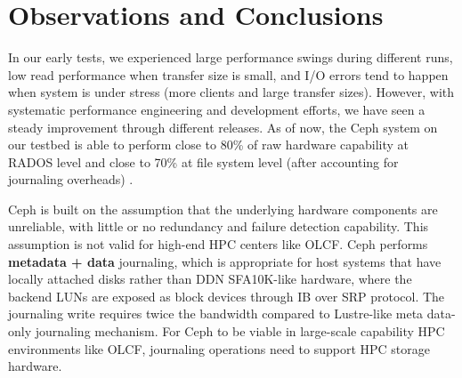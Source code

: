 \section{Observations and Conclusions}
\label{sec:conclusion}

In our early tests, we experienced large performance swings during different
runs, low read performance when transfer size is small, and I/O errors tend to
happen when system is under stress (more clients and large transfer sizes).
However, with systematic performance engineering and development efforts, we
have seen a steady improvement through different releases. As of now, the Ceph
system on our testbed is able to perform close to 80\% of raw hardware
capability at RADOS level and close to 70\% at file system level (after
accounting for journaling overheads) . 

Ceph is built on the assumption that the underlying hardware components are
unreliable, with little or no redundancy and failure detection capability.
This assumption is not valid for high-end HPC centers like OLCF.
Ceph performs \textbf{metadata + data} journaling, which is appropriate for host
systems that have locally attached disks rather than DDN SFA10K-like hardware,
where the backend LUNs are exposed as block devices through IB over SRP
protocol. The journaling write requires twice the bandwidth compared to
Lustre-like meta data-only journaling mechanism. For Ceph to be viable in
large-scale capability HPC environments like OLCF, journaling operations need
to support HPC storage hardware.



